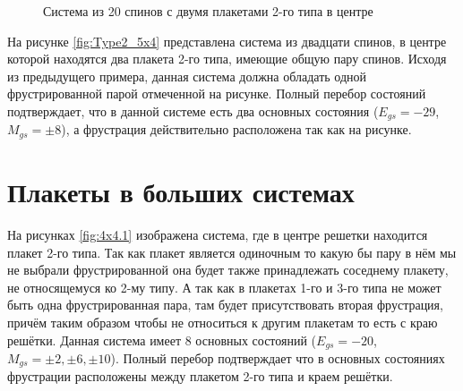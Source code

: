 \documentclass[utf8, babel, sor, jor, amsmath, amssymb, reprint]{elsarticle} %
\begin{document}
\begin{figure}[H]
	\centering
	\caption{Система из 20 спинов с двумя плакетами 2-го типа в центре}
	\label{fig:Type2_5x4}
\end{figure}

На рисунке \eqref{fig:Type2_5x4} представлена система из двадцати спинов, в центре которой находятся два плакета 2-го типа, имеющие общую пару спинов. Исходя из предыдущего примера, данная система должна обладать одной фрустрированной парой отмеченной на рисунке. Полный перебор состояний подтверждает, что в данной системе есть два основных состояния ($E_{gs}=-29$, $M_{gs}=\pm 8$), а фрустрация действительно расположена так как на рисунке.

\section{Плакеты в больших системах}

На рисунках \ref{fig:4x4.1} изображена система, где в центре решетки находится плакет 2-го типа. Так как плакет является одиночным то какую бы пару в нём мы не выбрали фрустрированной она будет также принадлежать соседнему плакету, не относящемуся ко 2-му типу. А так как в плакетах 1-го и 3-го типа не может быть одна фрустрированная пара, там будет присутствовать вторая фрустрация, причём таким образом чтобы не относиться к другим плакетам то есть с краю решётки. Данная система имеет 8 основных состояний ($E_{gs}=-20$, $M_{gs}=\pm 2, \pm 6, \pm 10$). Полный перебор подтверждает что в основных состояниях фрустрации расположены между плакетом 2-го типа и краем решётки.
\end{document}
